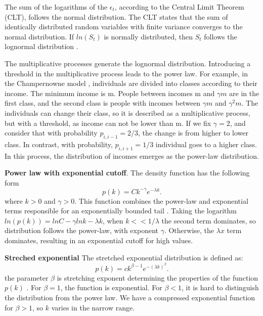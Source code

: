 The sum of the logarithms of the $\epsilon_t$, according to the Central Limit Theorem (CLT), follows the normal distribution. The CLT states that the sum of identically distributed random variables with finite variance converges to the normal distribution. If $ln(S_t)$ is normally distributed, then $S_t$ follows the lognormal distribution \cite{mitzenmacher2004brief}.   

The multiplicative processes generate the lognormal distribution. Introducing a threshold in the multiplicative process leads to the power law. For example, in the Champernowne model \cite{caldarelli2007scalefree}, individuals are divided into classes according to their income. The minimum income is m. People between incomes m and $\gamma m$ are in the first class, and the second class is people with incomes between $\gamma m$ and $\gamma^2 m $. The individuals can change their class, so it is described as a multiplicative process, but with a threshold, as income can not be lower than m. If we fix $\gamma=2$, and consider that with probability $p_{i,i-1}=2/3$, the change is from higher to lower class. In contrast, with probability, $p_{i, i+1}=1/3$ individual goes to a higher class. In this process, the distribution of incomes emerges as the power-law distribution.

\textbf{Power law with exponential cutoff}. The density function has the following form 
\begin{equation}
p(k) = C k^{-\gamma}e^{-\lambda k}.
\end{equation}
where $k>0$ and $\gamma>0$. This function combines the power-law and exponential terms responsible for an exponentially bounded tail \cite{barabasi2016network}. Taking the logarithm $ln(p(k)) = lnC - \gamma lnk - \lambda k$, when $k<<1/\lambda$ the second term dominates, so distribution follows the power-law, with exponent $\gamma$. Otherwise, the $\lambda x$ term dominates, resulting in an exponential cutoff for high values. 

\textbf{Streched exponential} The stretched exponential distribution is defined as:
\begin{equation}
p(k) = c k^{\beta - 1}e^{-(\lambda k)^{\beta}}.
\end{equation}
the parameter $\beta$ is stretching exponent determining the properties of the function $p(k)$ \cite{barabasi2016network}. For $\beta=1$, the function is exponential. For $\beta<1$, it is hard to distinguish the distribution from the power law. We have a compressed exponential function for $\beta>1$, so $k$ varies in the narrow range.

